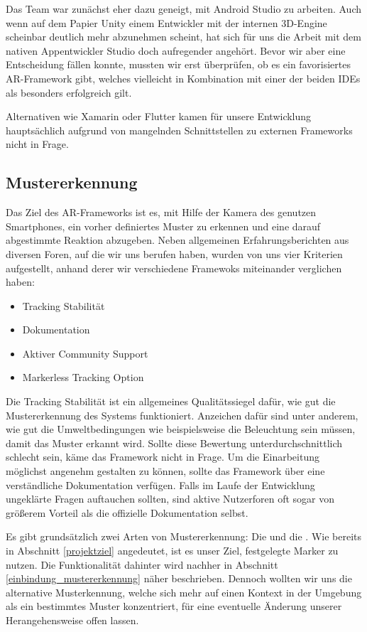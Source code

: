 Das Team war zunächst eher dazu geneigt, mit Android Studio zu arbeiten. Auch wenn auf dem Papier Unity einem Entwickler mit der internen 3D-Engine scheinbar deutlich mehr abzunehmen scheint, hat sich für uns die Arbeit mit dem nativen Appentwickler Studio doch aufregender angehört. Bevor wir aber eine Entscheidung fällen konnte, mussten wir erst überprüfen, ob es ein favorisiertes AR-Framework gibt, welches vielleicht in Kombination mit einer der beiden IDEs als besonders erfolgreich gilt.

Alternativen wie Xamarin oder Flutter kamen für unsere Entwicklung hauptsächlich aufgrund von mangelnden Schnittstellen zu externen Frameworks nicht in Frage.
\subsection{Mustererkennung}
Das Ziel des AR-Frameworks ist es, mit Hilfe der Kamera des genutzen Smartphones, ein vorher definiertes Muster zu erkennen und eine darauf abgestimmte Reaktion abzugeben. Neben allgemeinen Erfahrungsberichten aus diversen Foren, auf die wir uns berufen haben, wurden von uns vier Kriterien aufgestellt, anhand derer wir verschiedene Framewoks miteinander verglichen haben:
\begin{itemize}
\item Tracking Stabilität
\item Dokumentation
\item Aktiver Community Support
\item Markerless Tracking Option
\end{itemize}
Die Tracking Stabilität ist ein allgemeines Qualitätssiegel dafür, wie gut die Mustererkennung des Systems funktioniert. Anzeichen dafür sind unter anderem, wie gut die Umweltbedingungen wie beispielsweise die Beleuchtung sein müssen, damit das Muster erkannt wird. Sollte diese Bewertung unterdurchschnittlich schlecht sein, käme das Framework nicht in Frage.
Um die Einarbeitung möglichst angenehm gestalten zu können, sollte das Framework über eine verständliche Dokumentation verfügen.
Falls im Laufe der Entwicklung ungeklärte Fragen auftauchen sollten, sind aktive Nutzerforen oft sogar von größerem Vorteil als die offizielle Dokumentation selbst. 

Es gibt grundsätzlich zwei Arten von Mustererkennung: Die  und die . Wie bereits in Abschnitt \ref{projektziel} angedeutet, ist es unser Ziel, festgelegte Marker zu nutzen. Die Funktionalität dahinter wird nachher in Abschnitt \ref{einbindung_mustererkennung} näher beschrieben. Dennoch wollten wir uns die alternative  Musterkennung, welche sich mehr auf einen Kontext in der Umgebung als ein bestimmtes Muster konzentriert, für eine eventuelle Änderung unserer Herangehensweise offen lassen.

